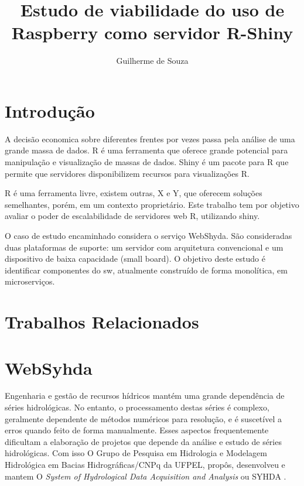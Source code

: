 \documentclass[12pt,english,brazil]{article}
\title{Estudo de viabilidade do uso de Raspberry como servidor R-Shiny}
\author{Guilherme de Souza\inst{1}}
\begin{document}
 

\maketitle
    
\en
\begin{abstract}


\end{abstract}

\br
\begin{resumo} 


\end{resumo}



\section{Introdução}

A decisão economica sobre diferentes frentes por vezes passa pela análise de uma grande massa de dados. R é uma ferramenta que oferece grande potencial para manipulação e visualização de massas de dados. Shiny é um pacote para R que permite que servidores disponibilizem recursos para visualizações R.

R é uma ferramenta livre, existem outras, X e Y, que oferecem soluções semelhantes, porém, em um contexto proprietário. Este trabalho tem por objetivo avaliar o poder de escalabilidade de servidores web R, utilizando shiny.

O caso de estudo encaminhado considera o serviço WebShyda. São consideradas duas plataformas de suporte: um servidor com arquitetura convencional e um dispositivo de baixa capacidade (small board). O objetivo deste estudo é identificar componentes do sw, atualmente construído de forma monolítica, em microserviços. 

\section{Trabalhos Relacionados} \label{sec:TrabalhosRelacionados}

\section{WebSyhda}\label{sec:websyhda}
Engenharia e gestão de recursos hídricos mantém uma grande dependência de séries hidrológicas. No entanto, o processamento destas séries é complexo, geralmente dependente de métodos numéricos para resolução, e é suscetível a erros quando feito de forma manualmente. Esses aspectos frequentemente dificultam a elaboração de projetos que depende da análise e estudo de séries hidrológicas. Com isso O Grupo de Pesquisa em Hidrologia e Modelagem Hidrológica em Bacias Hidrográficas/CNPq da UFPEL, propôs, desenvolveu e mantem O \emph{System of Hydrological Data Acquisition and Analysis} ou SYHDA \cite{syhda}.
\end{document}
